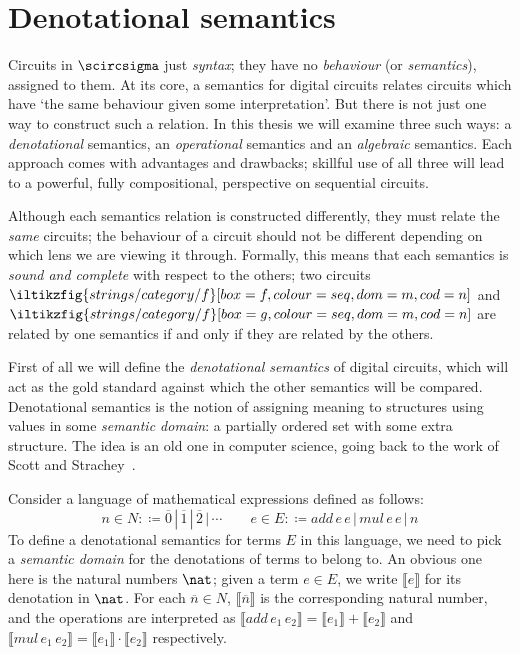 \chapter{Denotational semantics}\label{chap:denotational}

Circuits in \(\scircsigma\) just \emph{syntax}; they have no
\emph{behaviour} (or \emph{semantics}), assigned to them.
At its core, a semantics for digital circuits relates circuits which have `the
same behaviour given some interpretation'.
But there is not just one way to construct such a relation.
In this thesis we will examine three such ways: a \emph{denotational} semantics,
an \emph{operational} semantics and an \emph{algebraic} semantics.
Each approach comes with advantages and drawbacks; skillful use of all three
will lead to a powerful, fully compositional, perspective on sequential
circuits.

Although each semantics relation is constructed differently, they must
relate the \emph{same} circuits; the behaviour of a circuit should not be
different depending on which lens we are viewing it through.
Formally, this means that each semantics is \emph{sound and complete} with
respect to the others; two circuits \(
\iltikzfig{strings/category/f}[box=f,colour=seq,dom=m,cod=n]
\) and \(
\iltikzfig{strings/category/f}[box=g,colour=seq,dom=m,cod=n]
\) are related by one semantics if and only if they are related by the others.

First of all we will define the \emph{denotational semantics} of digital
circuits, which will act as the gold standard against which the other
semantics will be compared.
Denotational semantics is the notion of assigning meaning to structures using
values in some \emph{semantic domain}: a partially ordered set with some
extra structure.
The idea is an old one in computer science, going back to the work of Scott and
Strachey~\cite{scott1970outline,scott1971mathematical}.

\begin{example}\label{ex:expressions-denotational}
    Consider a language of mathematical expressions defined as
    follows:
    \[
        n \in N :\coloneqq \overline{0} \,|\, \overline{1} \,|\, \overline{2} \,|\,
        \cdots
        \qquad
        e \in E :\coloneqq add \, e \, e \,|\, mul \, e \, e \,|\,  n
    \]
    To define a denotational semantics for terms \(E\) in this language, we need
    to pick a \emph{semantic domain} for the denotations of terms to belong to.
    An obvious one here is the natural numbers \(\nat\); given a term
    \(e \in E\), we write \(\llbracket{e}\rrbracket\) for its denotation in
    \(\nat\).
    For each \(\overline{n} \in N\), \(\llbracket{\overline{n}}\rrbracket\) is
    the corresponding natural number, and the operations are interpreted as \(
    \llbracket{add \, e_1 \, e_2}\rrbracket
    = \llbracket{e_1}\rrbracket + \llbracket{e_2}\rrbracket
    \) and \(
    \llbracket{mul \, e_1 \, e_2}\rrbracket
    = \llbracket{e_1}\rrbracket \cdot \llbracket{e_2}\rrbracket
    \) respectively.
\end{example}

